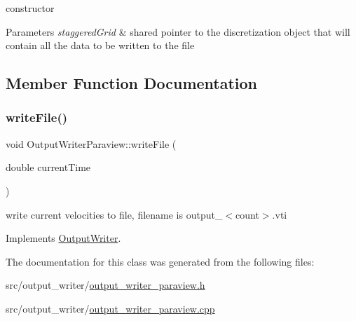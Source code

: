 constructor 
\begin{DoxyParams}{Parameters}
{\em staggered\+Grid} & shared pointer to the discretization object that will contain all the data to be written to the file \\
\hline
\end{DoxyParams}


\subsection{Member Function Documentation}
\mbox{\label{classOutputWriterParaview_a9e203b63d0e2f26ad53d18ee1821c6bb}} 
\subsubsection{\texorpdfstring{writeFile()}{writeFile()}}
{\footnotesize\ttfamily void Output\+Writer\+Paraview\+::write\+File (\begin{DoxyParamCaption}\item[{double}]{current\+Time }\end{DoxyParamCaption})\hspace{0.3cm}{\ttfamily [virtual]}}



write current velocities to file, filename is output\+\_\+$<$count$>$.\+vti 



Implements \mbox{\hyperlink{classOutputWriter_ac625c204affdc05919388a3549c2e945}{Output\+Writer}}.



The documentation for this class was generated from the following files\+:\begin{DoxyCompactItemize}
\item 
src/output\+\_\+writer/\mbox{\hyperlink{output__writer__paraview_8h}{output\+\_\+writer\+\_\+paraview.\+h}}\item 
src/output\+\_\+writer/\mbox{\hyperlink{output__writer__paraview_8cpp}{output\+\_\+writer\+\_\+paraview.\+cpp}}\end{DoxyCompactItemize}
